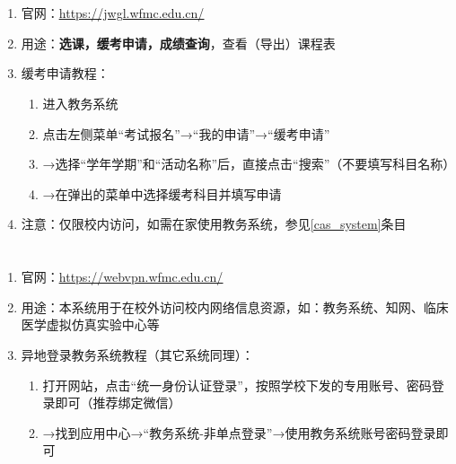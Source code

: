 \section[教务系统]{\textbf{}}
\begin{enumerate}
    \item 官网：\uline{\href{https://jwgl.wfmc.edu.cn/}{https://jwgl.wfmc.edu.cn/}}
    \item 用途：\textbf{选课，缓考申请，成绩查询}，查看（导出）课程表
    \item 缓考申请教程：
          \begin{enumerate}[（1）]
              \item 进入教务系统
              \item 点击左侧菜单“考试报名”→“我的申请”→“缓考申请”
              \item →选择“学年学期”和“活动名称”后，直接点击“搜索”（不要填写科目名称）
              \item →在弹出的菜单中选择缓考科目并填写申请\footnotemark
          \end{enumerate}
    \item 注意：仅限校内访问，如需在家使用教务系统，参见\uline{\ref{cas_system}}条目
\end{enumerate}

\section[资源访问控制系统]{\textbf{}\footnotemark}
\label{cas_system}
\begin{enumerate}
    \item 官网：\uline{\href{https://webvpn.wfmc.edu.cn/}{https://webvpn.wfmc.edu.cn/}}
    \item 用途：本系统用于在校外访问校内网络信息资源，如：教务系统、知网、临床医学虚拟仿真实验中心\footnotemark 等
    \item 异地登录教务系统教程（其它系统同理）：
          \begin{enumerate}[（1）]
              \item 打开网站，点击“统一身份认证登录”，按照学校下发的专用账号、密码登录即可（推荐绑定微信）
              \item →找到应用中心→“教务系统-非单点登录”\footnotemark →使用教务系统账号密码登录即可
          \end{enumerate}
\end{enumerate}

